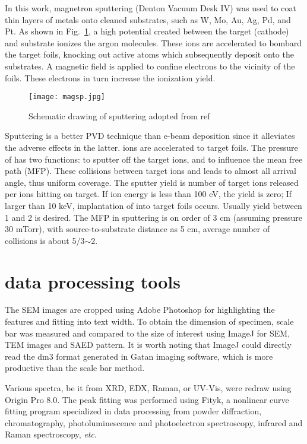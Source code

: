 In this work, magnetron sputtering (Denton Vacuum Desk IV) was used to coat thin layers of metals onto cleaned substrates, such as W, Mo, Au, Ag, Pd, and Pt. As shown in Fig.~\ref{fig:ch2magsp}, a high potential created between the target (cathode) and substrate ionizes the argon molecules. These ions are accelerated to bombard the target foils, knocking out active atoms which subsequently deposit onto the substrates. A magnetic field is applied to confine electrons to the vicinity of the foils. These electrons in turn increase the ionization yield. 

\begin{figure}[htb]
\centering
\texttt{[image: magsp.jpg]}
\caption[magnetron sputtering system]{Schematic drawing of sputtering adopted from ref\cite{Song2008}}
\label{fig:ch2magsp}
\end{figure}

Sputtering is a better PVD technique than e-beam deposition since it alleviates the adverse effects in the latter.  ions are accelerated to target foils. The pressure of  has two functions: to sputter off the target ions, and to influence the mean free path (MFP). These collisions between target ions and  leads to almost all arrival angle, thus uniform coverage. The sputter yield is number of target ions released per ions hitting on target. If  ion energy is less than 100 eV, the yield is zero; If larger than 10 keV, implantation of  into target foils occurs. Usually yield between 1 and 2 is desired. The MFP in sputtering is on order of 3 cm (assuming pressure 30 mTorr), with source-to-substrate distance as 5 cm, average number of collisions is about 5/3$\sim$2. 


\section{data processing tools}

The SEM images are cropped using Adobe Photoshop for highlighting the features and fitting into text width. To obtain the dimension of specimen, scale bar was measured and compared to the size of interest using ImageJ\cite{Schneider2012} for SEM, TEM images and SAED pattern. It is worth noting that ImageJ could directly read the dm3 format generated in Gatan imaging software, which is more productive than the scale bar method.

Various spectra, be it from XRD, EDX, Raman, or UV-Vis, were redraw using Origin Pro 8.0. The peak fitting was performed using Fityk, a nonlinear curve fitting program specialized in data processing from powder diffraction, chromatography, photoluminescence and photoelectron spectroscopy, infrared and Raman spectroscopy, \emph{etc}.\cite{Wojdyr2010}


